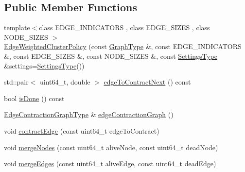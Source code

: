 \subsection*{Public Member Functions}
\begin{DoxyCompactItemize}
\item 
{\footnotesize template$<$class E\+D\+G\+E\+\_\+\+I\+N\+D\+I\+C\+A\+T\+O\+R\+S , class E\+D\+G\+E\+\_\+\+S\+I\+Z\+E\+S , class N\+O\+D\+E\+\_\+\+S\+I\+Z\+E\+S $>$ }\\\hyperlink{classnifty_1_1graph_1_1agglo_1_1EdgeWeightedClusterPolicy_a028e533bd1a4eca1b6fdebb70b50b899}{Edge\+Weighted\+Cluster\+Policy} (const \hyperlink{classnifty_1_1graph_1_1agglo_1_1EdgeWeightedClusterPolicy_a8e910f7b9d0c1baa1de7b6b1c3e58397}{Graph\+Type} \&, const E\+D\+G\+E\+\_\+\+I\+N\+D\+I\+C\+A\+T\+O\+R\+S \&, const E\+D\+G\+E\+\_\+\+S\+I\+Z\+E\+S \&, const N\+O\+D\+E\+\_\+\+S\+I\+Z\+E\+S \&, const \hyperlink{classnifty_1_1graph_1_1agglo_1_1EdgeWeightedClusterPolicy_a6c9e2acec086a9fcc4391f067a4ded46}{Settings\+Type} \&settings=\hyperlink{classnifty_1_1graph_1_1agglo_1_1EdgeWeightedClusterPolicy_a6c9e2acec086a9fcc4391f067a4ded46}{Settings\+Type}())
\item 
std\+::pair$<$ uint64\+\_\+t, double $>$ \hyperlink{classnifty_1_1graph_1_1agglo_1_1EdgeWeightedClusterPolicy_a6ab0f6aa52808094a3cf375a5f6b085e}{edge\+To\+Contract\+Next} () const 
\item 
bool \hyperlink{classnifty_1_1graph_1_1agglo_1_1EdgeWeightedClusterPolicy_a46dcdcc192a1e07625a7c8c576dc5149}{is\+Done} () const 
\item 
\hyperlink{classnifty_1_1graph_1_1agglo_1_1EdgeWeightedClusterPolicy_af2c3024ed1be514c58004dfa7e77448b}{Edge\+Contraction\+Graph\+Type} \& \hyperlink{classnifty_1_1graph_1_1agglo_1_1EdgeWeightedClusterPolicy_ac66821b0db08e136631b0c75adf660d0}{edge\+Contraction\+Graph} ()
\item 
void \hyperlink{classnifty_1_1graph_1_1agglo_1_1EdgeWeightedClusterPolicy_ab17fb3b1739432d2263366d2a3f0800c}{contract\+Edge} (const uint64\+\_\+t edge\+To\+Contract)
\item 
void \hyperlink{classnifty_1_1graph_1_1agglo_1_1EdgeWeightedClusterPolicy_ab6176f00d96818257fdffdb7a363c5e1}{merge\+Nodes} (const uint64\+\_\+t alive\+Node, const uint64\+\_\+t dead\+Node)
\item 
void \hyperlink{classnifty_1_1graph_1_1agglo_1_1EdgeWeightedClusterPolicy_ad6e93f21537c3931da24765c689de3c1}{merge\+Edges} (const uint64\+\_\+t alive\+Edge, const uint64\+\_\+t dead\+Edge)
\item 

\end{DoxyCompactItemize}

